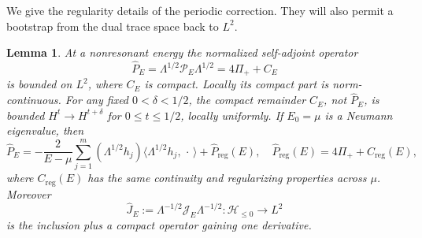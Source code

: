 \documentclass[11pt]{amsart}
\numberwithin{equation}{section}
\newtheorem{lemma}{Lemma}[section]
\newcommand{\PP}{\mathcal P}
\newcommand{\JJ}{\mathcal J}
\newcommand{\ip}[2]{\langle #1,#2\rangle}
\begin{document}
We give the regularity details of the periodic correction. They will
also permit a bootstrap from the dual trace space back to $L^2$.

\begin{lemma}\label{lem:principal}
At a nonresonant energy the normalized self-adjoint operator
\begin{equation}\label{eq:normalized}
 \widehat P_E=\Lambda^{1/2}\PP_E\Lambda^{1/2}
       =4\Pi_++C_E
\end{equation}
is bounded on $L^2$, where $C_E$ is compact. Locally its compact part
is norm-continuous. For any fixed $0<\delta<1/2$, the compact remainder
$C_E$, not $\widehat P_E$, is bounded $H^t\to H^{t+\delta}$ for
$0\le t\le1/2$, locally uniformly.
If $E_0=\mu$ is a Neumann eigenvalue, then
\begin{equation}\label{eq:pole}
 \widehat P_E=-\frac2{E-\mu}\sum_{j=1}^m
    (\Lambda^{1/2}h_j)\ip{\Lambda^{1/2}h_j}{\,\cdot\,}
       +\widehat P_{\mathrm{reg}}(E),
 \quad \widehat P_{\mathrm{reg}}(E)=4\Pi_++C_{\mathrm{reg}}(E),
\end{equation}
where $C_{\mathrm{reg}}(E)$ has the same continuity and regularizing
properties across $\mu$.
Moreover
\begin{equation}\label{eq:Jhat}
 \widehat J_E:=\Lambda^{-1/2}\JJ_E\Lambda^{-1/2}
 :\mathcal H_{\le0}\longrightarrow L^2
\end{equation}
is the inclusion plus a compact operator gaining one derivative.
\end{lemma}
\end{document}
